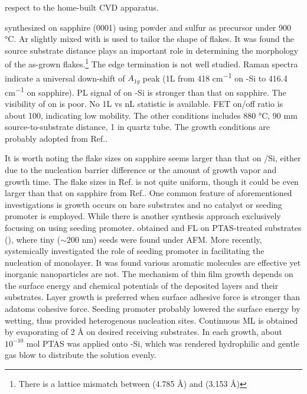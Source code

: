 respect to the home-built CVD apparatus.

\citeauthor{Zhang2013h} synthesized  on sapphire (0001) using  powder and sulfur as precursor under 900 \si{\degreeCelsius}.\cite{Zhang2013h} Ar slightly mixed with  is used to tailor the shape of  flakes. It was found the source substrate distance plays an important role in determining the morphology of the as-grown flakes.\footnote{There is a lattice mismatch between  (4.785 \si{\angstrom}) and  (3.153 \si{\angstrom})} The edge termination is not well studied. Raman spectra indicate a universal down-shift of $A_{1g}$ peak (1L from 418 \si{cm^{-1}} on -Si to 416.4 \si{cm^{-1}} on sapphire). PL signal of  on -Si is stronger than that on sapphire. The visibility of  on  is poor. No 1L vs nL statistic is available. FET on/off ratio is about 100, indicating low mobility. The other conditions includes 880 \si{\degreeCelsius}, 90 mm source-to-substrate distance, 1 in quartz tube. The growth conditions are probably adopted from Ref.\cite{Huanga2013}.

It is worth noting the flake sizes on sapphire\cite{Zhang2013h} seems larger than that on /Si\cite{Peimyoo2013}, either due to the nucleation barrier difference or the amount of growth vapor and growth time. The flake sizes in Ref.\cite{Cong2013} is not quite uniform, though it could be even larger than that on sapphire from Ref.\cite{Zhang2013h}. One common feature of aforementioned investigations is growth occurs on bare substrates and no catalyst or seeding promoter is employed. While there is another synthesis approach\cite{Lee2013,Ling2014} exclusively focusing on using seeding promoter. \citeauthor{Lee2013} obtained  and  FL on PTAS-treated substrates (), where tiny ($\sim 200$ nm) seeds were found under AFM. More recently, \citeauthor{Ling2014} systemically investigated the role of seeding promoter in facilitating the nucleation of  monolayer.\cite{Ling2014} It was found various aromatic molecules are effective yet inorganic nanoparticles are not. The mechanism of thin film growth depends on the surface energy and chemical potentials of the deposited layers and their substrates. Layer growth is preferred when surface adhesive force is stronger than adatoms cohesive force. Seeding promoter probably lowered the surface energy by wetting, thus provided heterogenous nucleation sites. Continuous  ML is obtained by evaporating  of 2 \si{\angstrom} on desired receiving substrates. In each growth, about $10^{-10}$ mol PTAS was applied onto -Si, which was rendered hydrophilic and gentle gas blow to distribute the solution evenly.


